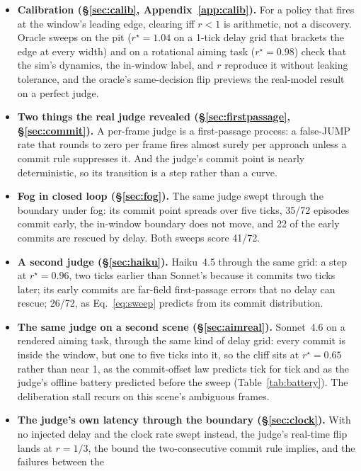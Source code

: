 \documentclass[11pt]{article}
\newcommand{\rstar}{r^{\star}}
\begin{document}
\begin{itemize}
  \item \textbf{Calibration (\S\ref{sec:calib}, Appendix~\ref{app:calib}).} For a policy
    that fires at the window's leading edge, clearing iff $r < 1$ is
    arithmetic, not a discovery. Oracle sweeps on the pit ($\rstar = 1.04$ on
    a 1-tick delay grid that brackets the edge at every width) and on a
    rotational aiming task ($\rstar = 0.98$) check that the sim's dynamics,
    the in-window label, and $r$ reproduce it without leaking tolerance, and
    the oracle's same-decision flip previews the real-model result on a
    perfect judge.
  \item \textbf{Two things the real judge revealed
    (\S\ref{sec:firstpassage}, \S\ref{sec:commit}).} A per-frame judge is a
    first-passage process: a false-JUMP rate that rounds to zero per frame
    fires almost surely per approach unless a commit rule suppresses it. And
    the judge's commit point is nearly deterministic, so its transition is a
    step rather than a curve.
  \item \textbf{Fog in closed loop (\S\ref{sec:fog}).} The same judge swept
    through the boundary under fog: its commit point spreads over five ticks,
    35/72 episodes commit early, the in-window boundary does not move, and 22
    of the early commits are rescued by delay. Both sweeps score 41/72.
  \item \textbf{A second judge (\S\ref{sec:haiku}).} Haiku~4.5 through
    the same grid: a step at $\rstar = 0.96$, two ticks earlier than
    Sonnet's because it commits two ticks later; its early commits are
    far-field first-passage errors that no delay can rescue; 26/72, as
    Eq.~\ref{eq:sweep} predicts from its commit distribution.
  \item \textbf{The same judge on a second scene (\S\ref{sec:aimreal}).}
    Sonnet~4.6 on a rendered aiming task, through the same kind of delay
    grid: every commit is inside the window, but one to five ticks into it,
    so the cliff sits at $\rstar = 0.65$ rather than near 1, as the
    commit-offset law predicts tick for tick and as the judge's offline
    battery predicted before the sweep (Table~\ref{tab:battery}). The
    deliberation stall recurs on this scene's ambiguous frames.
  \item \textbf{The judge's own latency through the boundary
    (\S\ref{sec:clock}).} With no injected delay and the clock rate swept
    instead, the judge's real-time flip lands at $r = 1/3$, the bound the
    two-consecutive commit rule implies, and the failures between the

\end{itemize}
\end{document}

